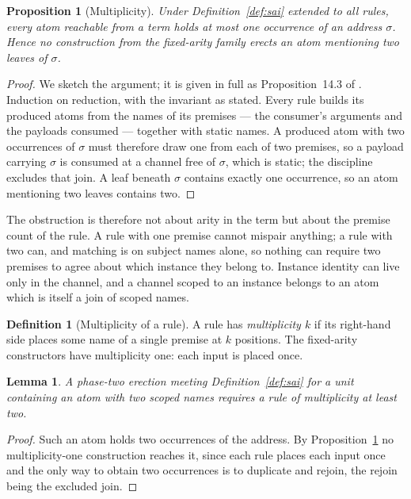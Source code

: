 \documentclass[11pt]{article}
\theoremstyle{plain}
\newtheorem{proposition}[theorem]{Proposition}
\newtheorem{lemma}[theorem]{Lemma}
\theoremstyle{definition}
\newtheorem{definition}[theorem]{Definition}
\theoremstyle{remark}
\begin{document}
\begin{proposition}[Multiplicity]
\label{prop:multiplicity}
Under Definition~\ref{def:sai} extended to all rules, every atom reachable
from a term holds at most one occurrence of an address $\sigma$. Hence no
construction from the fixed-arity family erects an atom mentioning two leaves
of $\sigma$.
\end{proposition}

\begin{proof}
We sketch the argument; it is given in full as Proposition~14.3 of
\cite{rhocombmat}. Induction on reduction, with the invariant as stated. Every rule builds its
produced atoms from the names of its premises --- the consumer's arguments
and the payloads consumed --- together with static names. A produced atom
with two occurrences of $\sigma$ must therefore draw one from each of two
premises, so a payload carrying $\sigma$ is consumed at a channel free of
$\sigma$, which is static; the discipline excludes that join. A leaf beneath
$\sigma$ contains exactly one occurrence, so an atom mentioning two leaves
contains two.
\end{proof}

The obstruction is therefore not about arity in the term but about the
premise count of the rule. A rule with one premise cannot mispair anything;
a rule with two can, and matching is on subject names alone, so nothing can
require two premises to agree about which instance they belong to. Instance
identity can live only in the channel, and a channel scoped to an instance
belongs to an atom which is itself a join of scoped names.

\begin{definition}[Multiplicity of a rule]
\label{def:mult}
A rule has \emph{multiplicity $k$} if its right-hand side places some name of
a single premise at $k$ positions. The fixed-arity constructors have
multiplicity one: each input is placed once.
\end{definition}

\begin{lemma}
\label{lem:needmult}
A phase-two erection meeting Definition~\ref{def:sai} for a unit containing
an atom with two scoped names requires a rule of multiplicity at least two.
\end{lemma}

\begin{proof}
Such an atom holds two occurrences of the address. By
Proposition~\ref{prop:multiplicity} no multiplicity-one construction reaches
it, since each rule places each input once and the only way to obtain two
occurrences is to duplicate and rejoin, the rejoin being the excluded join.
\end{proof}
\end{document}
